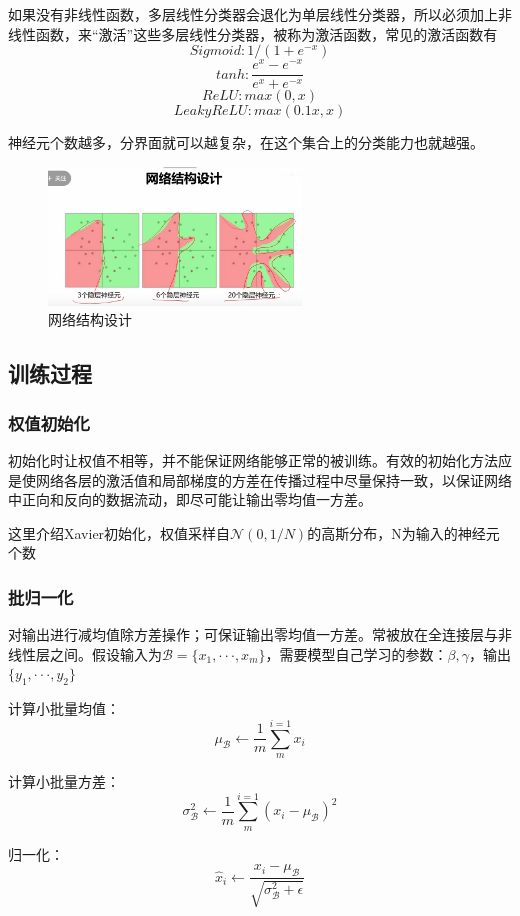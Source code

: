 \documentclass[12pt]{article}
\begin{document}
如果没有非线性函数，多层线性分类器会退化为单层线性分类器，所以必须加上非线性函数，来“激活”这些多层线性分类器，被称为激活函数，常见的激活函数有
\\$$Sigmoid : 1/(1+e^{-x})$$
$$tanh : \frac{e^x-e^{-x}}{e^x+e^{-x}}$$
$$ReLU : max(0,x)$$
$$Leaky ReLU : max(0.1x,x)$$

神经元个数越多，分界面就可以越复杂，在这个集合上的分类能力也就越强。
\begin{figure}[ht]  %
\centering
\includegraphics[width=0.6\textwidth]{pic20.png}
\caption{网络结构设计}
\end{figure}

\subsection{训练过程}
\subsubsection{权值初始化}
初始化时让权值不相等，并不能保证网络能够正常的被训练。有效的初始化方法应是使网络各层的激活值和局部梯度的方差在传播过程中尽量保持一致，以保证网络中正向和反向的数据流动，即尽可能让输出零均值一方差。

这里介绍Xavier初始化，权值采样自$\mathcal{N}(0,1/N)$的高斯分布，N为输入的神经元个数

\subsubsection{批归一化}
对输出进行减均值除方差操作；可保证输出零均值一方差。常被放在全连接层与非线性层之间。假设输入为$\mathcal{B} =\{x_1,···,x_m\}$，需要模型自己学习的参数：$\beta ,\gamma$，输出$\{y_1,···,y_2\}$

计算小批量均值：
$$\mu_\mathcal{B}\leftarrow\frac{1}{m}\sum_{m}^{i=1}x_i$$

计算小批量方差：
$$\sigma^2_\mathcal{B}\leftarrow\frac{1}{m}\sum_{m}^{i=1}(x_i-\mu_\mathcal{B})^2$$

归一化：
$$\widehat{x}_i\leftarrow\frac{x_i-\mu_\mathcal{B}}{\sqrt{\sigma^2_\mathcal{B}+\epsilon}}$$ 
\end{document}
